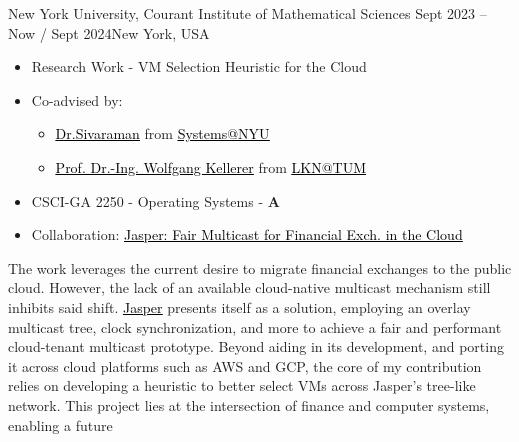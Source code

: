 \documentclass[10pt,a4paper,ragged2e,withhyper]{altacv}
\begin{document}
\begin{paracol}{2}

        {New York University, Courant Institute of Mathematical Sciences}
        {Sept 2023 -- Now / Sept 2024}{New York, USA}
\begin{itemize}
\item Research Work - VM Selection Heuristic for the Cloud    
\item Co-advised by:
    \begin{itemize}
        \item \href{https://anirudhsk.github.io/}{{\textcolor{black}{\underline{Dr.Sivaraman}}}} from \href{https://news.cs.nyu.edu/}{{\textcolor{black}{\underline{Systems@NYU}}}}
        \item \href{https://www.ce.cit.tum.de/en/lkn/team/staff/kellerer-wolfgang/}{{\textcolor{black}{\underline{Prof. Dr.-Ing. Wolfgang Kellerer}}}} from \href{https://www.ce.cit.tum.de/en/lkn/home/}{{\textcolor{black}{\underline{LKN@TUM}}}}
    \end{itemize}
\item CSCI-GA 2250 - Operating Systems - \textbf{A}
\item Collaboration: \href{https://arxiv.org/abs/2402.09527}{{\textcolor{black}{\underline{Jasper: Fair Multicast for Financial Exch. in the Cloud}}}}
\end{itemize}
The work leverages the current desire to migrate financial exchanges to the public cloud. 
However, the lack of an available cloud-native multicast mechanism still inhibits said shift.
\href{https://arxiv.org/abs/2402.09527}{{\textcolor{black}{\underline{Jasper}}}} presents itself as 
a solution, employing an overlay multicast tree, clock synchronization, and more
to achieve a fair and performant cloud-tenant multicast prototype. 
Beyond aiding in its development, and porting it across cloud platforms such as AWS and GCP, 
the core of my contribution relies on developing a heuristic to better select VMs across Jasper's tree-like network.
This project lies at the intersection of finance and computer systems, enabling a future

\end{paracol}
\end{document}
